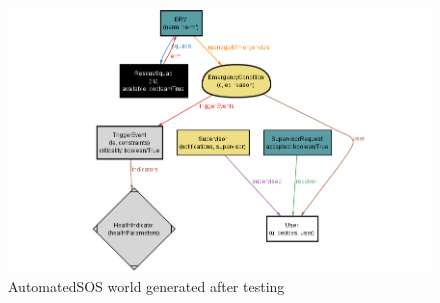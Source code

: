 {}

\begin{figure}[H]
	\includegraphics[scale=0.45]{Images/alloy/ASOS_world.png}
	\vspace*{-2mm}\caption{AutomatedSOS world generated after testing}
	\label{figure20}
\end{figure}








